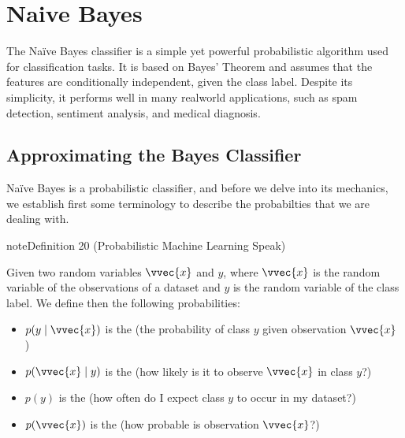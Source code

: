 \documentclass[letterpaper,10pt,english]{jupyterBook}
\begin{document}
\sphinxstepscope


\section{Naive Bayes}
\label{\detokenize{classification_naive_bayes:naive-bayes}}\label{\detokenize{classification_naive_bayes::doc}}
\sphinxAtStartPar
The Naïve Bayes classifier is a simple yet powerful probabilistic algorithm used for classification tasks. It is based on Bayes’ Theorem and assumes that the features are conditionally independent, given the class label. Despite its simplicity, it performs well in many real\sphinxhyphen{}world applications, such as spam detection, sentiment analysis, and medical diagnosis.


\subsection{Approximating the Bayes Classifier}
\label{\detokenize{classification_naive_bayes:approximating-the-bayes-classifier}}
\sphinxAtStartPar
Naïve Bayes is a probabilistic classifier, and before we delve into its mechanics, we establish first some terminology to describe the probabilties that we are dealing with.
\label{classification_naive_bayes:definition-0}
\begin{sphinxadmonition}{note}{Definition 20 (Probabilistic Machine Learning Speak)}



\sphinxAtStartPar
Given two random variables \(\vvec{x}\) and \(y\), where \(\vvec{x}\) is the random variable of the observations of a dataset and \(y\) is the random variable of the class label. We define then the following probabilities:
\begin{itemize}
\item {} 
\sphinxAtStartPar
\(p(y\mid \vvec{x})\) is the  (the probability of class \(y\) given observation \(\vvec{x}\) )

\item {} 
\sphinxAtStartPar
\(p(\vvec{x}\mid y)\) is the  (how likely is it to observe \(\vvec{x}\) in class \(y\)?)

\item {} 
\sphinxAtStartPar
\(p(y)\) is the  (how often do I expect class \(y\) to occur in my dataset?)

\item {} 
\sphinxAtStartPar
\(p(\vvec{x})\) is the  (how probable is observation \(\vvec{x}\)?)

\end{itemize}
\end{sphinxadmonition}
\end{document}

